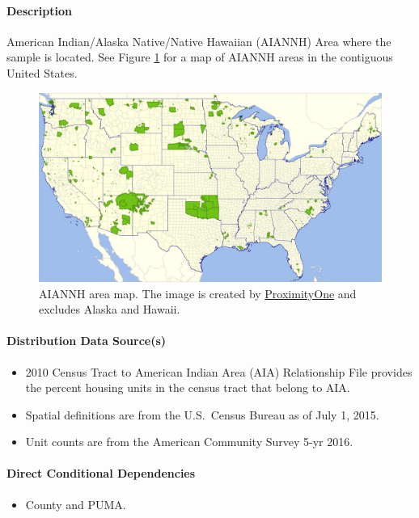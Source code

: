 \paragraph{Description}
American Indian/Alaska Native/Native Hawaiian (AIANNH) Area where the sample is located. See Figure \ref{fig:aiannh_map} for a map of AIANNH areas in the contiguous United States.

\begin{figure}
    \centering
    \includegraphics[width=1\linewidth]{images/aiannh_48b.jpg}
    \caption{AIANNH area map. The image is created by \href{https://proximityone.com/aiannh.htm}{ProximityOne} and excludes Alaska and Hawaii.}
    \label{fig:aiannh_map}
\end{figure}


\paragraph{Distribution Data Source(s)}
\begin{itemize}
    \item 2010 Census Tract to American Indian Area (AIA) Relationship File provides the percent housing units in the census tract that belong to AIA. 
    \item Spatial definitions are from the U.S.~Census Bureau as of July 1, 2015.
    \item Unit counts are from the American Community Survey 5-yr 2016.
\end{itemize}

\paragraph{Direct Conditional Dependencies}
\begin{itemize}
    \item County and PUMA.
\end{itemize}

